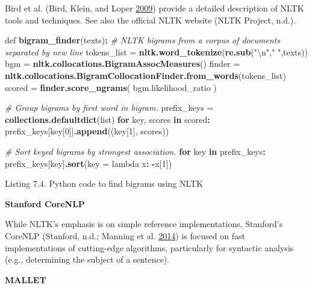 \documentclass[]{krantz}
\newenvironment{Shaded}{\begin{snugshade}}{\end{snugshade}}
\newcommand{\KeywordTok}[1]{\textcolor[rgb]{0.13,0.29,0.53}{\textbf{#1}}}
\newcommand{\DataTypeTok}[1]{\textcolor[rgb]{0.13,0.29,0.53}{#1}}
\newcommand{\DecValTok}[1]{\textcolor[rgb]{0.00,0.00,0.81}{#1}}
\newcommand{\CharTok}[1]{\textcolor[rgb]{0.31,0.60,0.02}{#1}}
\newcommand{\StringTok}[1]{\textcolor[rgb]{0.31,0.60,0.02}{#1}}
\newcommand{\CommentTok}[1]{\textcolor[rgb]{0.56,0.35,0.01}{\textit{#1}}}
\newcommand{\ControlFlowTok}[1]{\textcolor[rgb]{0.13,0.29,0.53}{\textbf{#1}}}
\newcommand{\OperatorTok}[1]{\textcolor[rgb]{0.81,0.36,0.00}{\textbf{#1}}}
\newcommand{\NormalTok}[1]{#1}
\begin{document}
Bird et al. (Bird, Klein, and Loper
\protect\hyperlink{ref-bird-09}{2009}) provide a detailed description of
NLTK tools and techniques. See also the official NLTK website (NLTK
Project, n.d.).

\begin{Shaded}
\begin{Highlighting}[]
\NormalTok{def }\KeywordTok{bigram_finder}\NormalTok{(texts)}\OperatorTok{:}
\StringTok{  }\CommentTok{# NLTK bigrams from a corpus of documents separated by new line}
\StringTok{  }\NormalTok{tokens_list =}\StringTok{ }\KeywordTok{nltk.word_tokenize}\NormalTok{(}\KeywordTok{re.sub}\NormalTok{(}\StringTok{"}\CharTok{\textbackslash{}n}\StringTok{"}\NormalTok{,}\StringTok{" "}\NormalTok{,texts))}
\NormalTok{  bgm    =}\StringTok{ }\KeywordTok{nltk.collocations.BigramAssocMeasures}\NormalTok{()}
\NormalTok{  finder =}\StringTok{ }\KeywordTok{nltk.collocations.BigramCollocationFinder.from_words}\NormalTok{(tokens_list)}
\NormalTok{  scored =}\StringTok{ }\KeywordTok{finder.score_ngrams}\NormalTok{( bgm.likelihood_ratio  )}

  \CommentTok{# Group bigrams by first word in bigram.}
\NormalTok{  prefix_keys =}\StringTok{ }\KeywordTok{collections.defaultdict}\NormalTok{(list)}
  \ControlFlowTok{for}\NormalTok{ key, scores }\ControlFlowTok{in}\NormalTok{ scored}\OperatorTok{:}
\StringTok{      }\NormalTok{prefix_keys[key[}\DecValTok{0}\NormalTok{]]}\KeywordTok{.append}\NormalTok{((key[}\DecValTok{1}\NormalTok{], scores))}

  \CommentTok{# Sort keyed bigrams by strongest association.}
  \ControlFlowTok{for}\NormalTok{ key }\ControlFlowTok{in}\NormalTok{ prefix_keys}\OperatorTok{:}
\StringTok{      }\NormalTok{prefix_keys[key]}\KeywordTok{.sort}\NormalTok{(}\DataTypeTok{key =}\NormalTok{ lambda x}\OperatorTok{:}\StringTok{ }\OperatorTok{-}\NormalTok{x[}\DecValTok{1}\NormalTok{])}
\end{Highlighting}
\end{Shaded}

Listing 7.4. Python code to find bigrams using NLTK

\textbf{Stanford CoreNLP}

While NLTK's emphasis is on simple reference implementations, Stanford's
CoreNLP (Stanford, n.d.; Manning et al.
\protect\hyperlink{ref-manning2014stanford}{2014}) is focused on fast
implementations of cutting-edge algorithms, particularly for syntactic
analysis (e.g., determining the subject of a sentence).

\textbf{MALLET}
\end{document}
